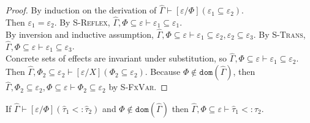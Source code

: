 \documentclass{llncs}
\newcommand{\keywadj}[1]{\mathtt{#1}}
\newcommand{\kwa}[1]{\keywadj{ #1 }}
\begin{document}
\begin{proof} By induction on the derivation of $\hat \Gamma \vdash [\varepsilon/\Phi](\varepsilon_1 \subseteq \varepsilon_2)$.\\

 Then $\varepsilon_1 = \varepsilon_2$. By \textsc{S-Reflex}, $\hat \Gamma, \Phi \subseteq \varepsilon \vdash \varepsilon_1 \subseteq \varepsilon_1$.\\

 By inversion and inductive assumption, $\hat \Gamma, \Phi \subseteq \varepsilon \vdash \varepsilon_1 \subseteq \varepsilon_2, \varepsilon_2 \subseteq \varepsilon_3$. By \textsc{S-Trans}, $\hat \Gamma, \Phi \subseteq \varepsilon \vdash \varepsilon_1 \subseteq \varepsilon_3$.\\

 Concrete sets of effects are invariant under substitution, so $\hat \Gamma, \Phi \subseteq \varepsilon \vdash \varepsilon_1 \subseteq \varepsilon_2$.\\

 Then $\hat \Gamma, \Phi_2 \subseteq \varepsilon_2 \vdash [\varepsilon/X](\Phi_2 \subseteq \varepsilon_2)$. Because $\Phi \notin \kwa{dom}(\hat \Gamma)$, then $\hat \Gamma, \Phi_2 \subseteq \varepsilon_2, \Phi \subseteq \varepsilon \vdash \Phi_2 \subseteq \varepsilon_2$ by \textsc{S-FxVar}.

\end{proof}

\hrulefill

\begin{lemma}
If $\hat \Gamma \vdash [\varepsilon/\Phi](\hat \tau_1 <: \hat \tau_2)$ and $\Phi \notin \kwa{dom}(\hat \Gamma)$ then $\hat \Gamma, \Phi \subseteq \varepsilon \vdash \hat \tau_1 <: \hat \tau_2$.
\end{lemma}
\end{document}
